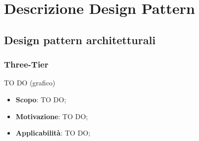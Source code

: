%




\section{Descrizione Design Pattern} %
\label{sec:descdp}
	\subsection{Design pattern architetturali} %

		\subsubsection{Three-Tier} %
		TO DO (grafico)
		\begin{itemize}
			\item \textbf{Scopo}: TO DO;
			\item \textbf{Motivazione}: TO DO;
			\item \textbf{Applicabilità}: TO DO;
		\end{itemize}

